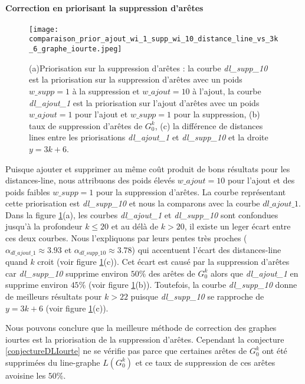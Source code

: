 \documentclass[onecolumn, 12pt]{book}
\begin{document}
\paragraph{Correction en priorisant la suppression d'ar\^etes } %
\begin{figure}[htb!] 
\centering
\texttt{[image: comparaison\_prior\_ajout\_wi\_1\_supp\_wi\_10\_distance\_line\_vs\_3k\_6\_graphe\_iourte.jpeg]}
\caption{(a)Priorisation sur la suppression d'ar\^etes : la courbe {\em dl\_supp\_10} est la priorisation sur la suppression d'ar\^etes avec un poids $w\_supp=1$ \`a la suppression et $w\_ajout = 10$ \`a l'ajout,   la courbe {\em dl\_ajout\_1} est la priorisation sur l'ajout d'ar\^etes avec un poids $w\_ajout=1$ pour l'ajout et $w\_supp = 1$ pour la suppression, (b) taux de suppression d'ar\^etes de $G_0^k$, (c) la diff\'erence de distances lines entre les priorisations {\em dl\_ajout\_1} et  {\em dl\_supp\_10}  et la droite $y=3k+6$. }
\label{priorAjout1Supp10} 
\end{figure}
Puisque ajouter et supprimer au m\^eme co\^ut produit de bons r\'esultats pour les distances-line,  nous attribuons des poids \'elev\'es  $w\_ajout = 10$ pour l'ajout et des poids faibles $w\_supp = 1$ pour la suppression d'ar\^etes. La courbe repr\'esentant cette priorisation est  {\em dl\_supp\_10} et nous la comparons avec la courbe $dl\_ajout\_1$.
\newline
Dans la figure  \ref{priorAjout1Supp10}(a), les courbes {\em dl\_ajout\_1} et {\em dl\_supp\_10} sont confondues jusqu'\`a la profondeur $k \le 20$ et au d\'el\`a de $k > 20$, il existe un leger \'ecart entre ces deux courbes. Nous l'expliquons par leurs pentes tr\`es proches ($\alpha_{dl\_ajout\_1} \approx 3.93$ et $\alpha_{dl\_supp\_10} \approx 3.78$) qui accentuent l'\'ecart des distances-line quand $k$ croit (voir figure \ref{priorAjout1Supp10}(c)). 
Cet \'ecart est caus\'e par la suppression d'ar\^etes car {\em dl\_supp\_10} supprime environ $50\%$ des ar\^etes de $G_0^k$ alors que  {\em dl\_ajout\_1} en supprime environ $45\%$ (voir figure \ref{priorAjout1Supp10}(b)).
Toutefois, la courbe {\em dl\_supp\_10} donne de meilleurs r\'esultats pour $k > 22$ puisque {\em dl\_supp\_10} se rapproche de $y=3k+6$ (voir figure \ref{priorAjout1Supp10}(c)).


Nous pouvons conclure que la meilleure m\'ethode de correction des graphes iourtes est la priorisation de la suppression d'ar\^etes.
Cependant la conjecture \ref{conjectureDLIourte} ne se v\'erifie pas parce que certaines ar\^etes de $G_0^k$ ont \'et\'e supprim\'ees du line-graphe $L(G_0^k)$ et ce taux de suppression de ces ar\^etes  avoisine les $50\%$.
\end{document}
